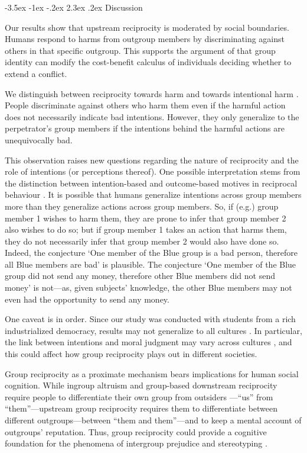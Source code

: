 \documentclass[12pt,a4paper]{article}\usepackage[]{graphicx}\usepackage[]{color}
\makeatletter
\renewcommand\section{\@startsection {section}{1}{\z@}%
{-3.5ex \@plus -1ex \@minus -.2ex}%
{2.3ex \@plus.2ex}%
{\bf\sffamily\Large}}
\makeatother
\begin{document}
\section{Discussion}
\label{sec:conclusion}

Our results show that upstream reciprocity is moderated by social boundaries. 
Humans respond to harms from outgroup members by discriminating against others 
in that specific outgroup. This supports the argument of \citet{Pietraszewski2016470} that group identity can modify the cost-benefit calculus of individuals deciding whether to extend a conflict. 

We distinguish between reciprocity towards harm and towards intentional harm
\citep{stanca2009testing}. People discriminate against others who harm them even
if the harmful action does not necessarily indicate bad intentions. However,
they only generalize to the perpetrator's  group members if the intentions
behind the harmful actions are unequivocally bad.

This observation raises new questions regarding the nature of reciprocity
and the role of intentions (or perceptions thereof). One possible
interpretation stems from the distinction between intention-based
and outcome-based motives in reciprocal behaviour \citep{falk2006theory}. It is
possible that humans generalize intentions across group members more than they generalize
actions across group members. So, if (e.g.)  group member 1 wishes to harm them,  they are prone to infer
that group member 2 also wishes to do so; but if group member 1 takes an action
that harms them, they do not necessarily infer that group member 2 would also
have done so. Indeed, the conjecture `One member of the Blue
group is a bad person, therefore all Blue members are bad' is plausible.
The conjecture `One member of the Blue group did not send any money,
therefore other Blue members did not send money' is not---as, given subjects' knowledge, the other Blue members may not even had the opportunity to send any money.

One caveat is in order.
Since our study was conducted with students from a rich industrialized democracy, results may not generalize to all cultures \citep{henrich2010most}. In particular, the link between intentions and moral judgment may vary across cultures \citep{barrett2016small}, and this could affect how group reciprocity plays out in different societies.

Group reciprocity as a proximate mechanism bears implications for human social cognition. While ingroup altruism and group-based downstream reciprocity require people to differentiate their own group from outsiders ---``us'' from ``them''---upstream group  reciprocity requires them to differentiate between different outgroups---between ``them and them''---and to keep a mental account of outgroups' reputation. Thus, group reciprocity could provide a cognitive foundation for the phenomena of intergroup prejudice and stereotyping \citep{allport1954nature}.
\end{document}
